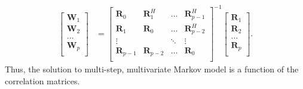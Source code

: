 \begin{align}
  \begin{bmatrix}
    \mathbf W_{1} \\ \mathbf W_{2} \\ \dots \\ \mathbf W_{p} \\
  \end{bmatrix}
  &= 
  \begin{bmatrix}
    \mathbf R_{0} & \mathbf R_1^H & \dots  & \mathbf R_{p-1}^H \\
    \mathbf R_{1} & \mathbf R_0   & \dots  & \mathbf R_{p-2}^H \\
    \vdots      &         & \ddots & \vdots \\
    \mathbf R_{p-1} & \mathbf R_{p-2}   & \dots  & \mathbf R_{0} \\
  \end{bmatrix}^{-1}
  \begin{bmatrix}
    \mathbf R_{1} \\ \mathbf R_{2} \\ \dots \\ \mathbf R_{p} \\
  \end{bmatrix}. \label{eq:toep-sol}
\end{align}
Thus, the solution to multi-step, multivariate Markov model is a function of the correlation matrices.


